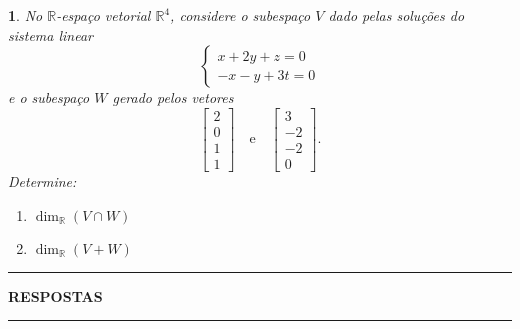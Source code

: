 \documentclass[12pt]{exam}
\newtheorem{exercicio}{}
\newcommand{\real}{\mathbb{R}}
\begin{document}
\begin{exercicio}
  No $\real$-espa\c{c}o vetorial $\real^4$, considere o subespa\c{c}o $V$ dado pelas solu\c{c}\~oes do sistema linear
  \[
    \begin{cases}
      x + 2y + z = 0\\
      -x -y + 3t = 0
    \end{cases}
  \]
  e o subespa\c{c}o $W$ gerado pelos vetores
  \[
    \begin{bmatrix}
      2\\0\\1\\1
    \end{bmatrix} \quad \mbox{e}\quad
    \begin{bmatrix}
      3\\-2\\-2\\0
    \end{bmatrix}.
  \]
  Determine:
  \begin{enumerate}[label={\alph*})]
    \item $\dim_\real(V \cap W)$
    \item $\dim_\real(V + W)$
  \end{enumerate}
\end{exercicio}

\newpage
{}
\hrule
\begin{center}
{\large\bf RESPOSTAS}
\end{center}
\hrule

\end{document}
